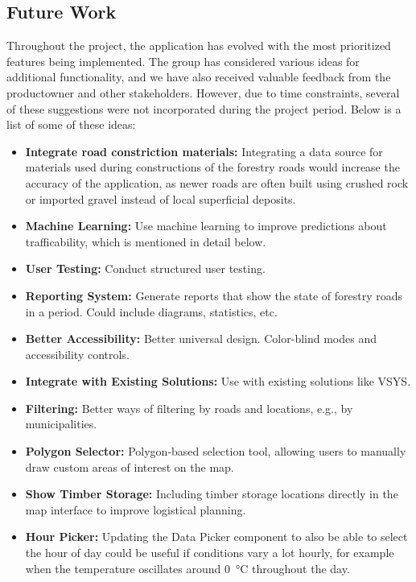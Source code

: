 \subsection{Future Work}

Throughout the project, the application has evolved with the most prioritized features being implemented. The group has considered various ideas for additional functionality, and we have also received valuable feedback from the \gls{productowner} and other stakeholders. However, due to time constraints, several of these suggestions were not incorporated during the project period. Below is a list of some of these ideas:

\begin{itemize}
    \item \textbf{Integrate road constriction materials:} Integrating a data source for materials used during constructions of the forestry roads would increase the accuracy of the application, as newer roads are often built using crushed rock or imported gravel instead of local superficial deposits.
    \item \textbf{Machine Learning:} Use machine learning to improve predictions about trafficability, which is mentioned in detail below.
    \item \textbf{User Testing:} Conduct structured user testing.
    \item \textbf{Reporting System:} Generate reports that show the state of forestry roads in a period. Could include diagrams, statistics, etc.
    \item \textbf{Better Accessibility:} Better universal design. Color-blind modes and accessibility controls.
    \item \textbf{Integrate with Existing Solutions:} Use with existing solutions like VSYS. 
    \item \textbf{Filtering:} Better ways of filtering by roads and locations, e.g., by municipalities.
    \item \textbf{Polygon Selector:} Polygon-based selection tool, allowing users to manually draw custom areas of interest on the map.
    \item \textbf{Show Timber Storage:} Including timber storage locations directly in the map interface to improve logistical planning.
    \item \textbf{Hour Picker:} Updating the Data Picker component to also be able to select the hour of day could be useful if conditions vary a lot hourly, for example when the temperature oscillates around \qty{0}{\celsius} throughout the day. 

\end{itemize}

